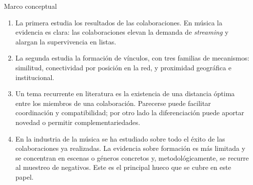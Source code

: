 \documentclass[
  8pt,
  ignorenonframetext,
  aspectratio=169,
  spanish,
]{beamer}
\begin{document}
\begin{frame}[shrink]{Marco conceptual}
{\begin{enumerate}
\item
  La primera estudia los resultados de las colaboraciones. En música la
  evidencia es clara: las colaboraciones elevan la demanda de
  \emph{streaming} y alargan la supervivencia en listas.
\item
  La segunda estudia la formación de vínculos, con tres familias de
  mecanismos: similitud, conectividad por posición en la red, y
  proximidad geográfica e institucional.
\item
  Un tema recurrente en literatura es la existencia de una distancia
  óptima entre los miembros de una colaboración. Parecerse puede
  facilitar coordinación y compatibilidad; por otro lado la
  diferenciación puede aportar novedad o permitir complementariedades.
\item
  En la industria de la música se ha estudiado sobre todo el éxito de
  las colaboraciones ya realizadas. La evidencia sobre formación es más
  limitada y se concentran en escenas o géneros concretos y,
  metodológicamente, se recurre al muestreo de negativos. Este es el
  principal hueco que se cubre en este papel.
\end{enumerate}}
\end{frame}
\end{document}
